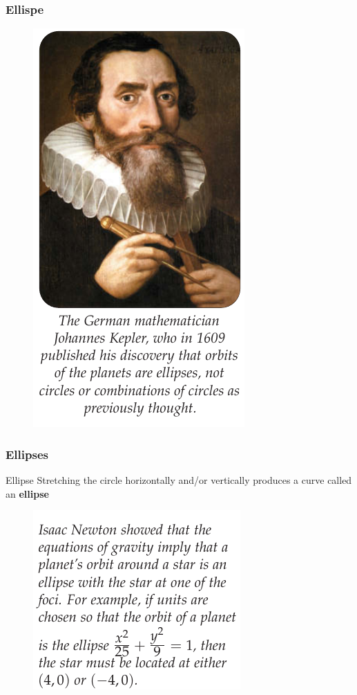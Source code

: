 \documentclass{beamer}
\begin{document}
 \begin{frame}
  \frametitle{Ellispe}
  \begin{figure}
    \centering
    \includegraphics[scale=0.38]{ellipse0.png}
  \end{figure}
 \end{frame}


 \begin{frame}
  \frametitle{Ellipses}
  \begin{block}{Ellipse}
    Stretching the circle horizontally and/or vertically produces a curve called an \textbf{ellipse}
  \end{block}
  \begin{figure}
    \centering 
    \includegraphics[scale=0.4]{ellipse1.png}
  \end{figure}
 \end{frame}
 
\end{document}
